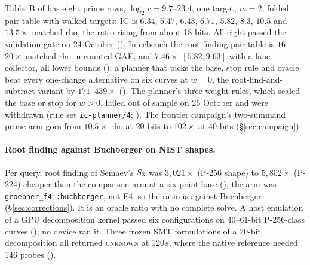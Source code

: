 Table~B of  has eight prime rows,
$\log_2 r=9.7$--$23.4$, one target, $m=2$, folded pair table with walked
targets: IC is $6.34$, $5.47$, $6.43$, $6.71$, $5.82$, $8.3$, $10.5$ and
$13.5\times$ matched rho, the ratio rising from about 18 bits. All eight
passed the validation gate on 24 October
(). In ecbench the root-finding
pair table is $16$--$20\times$ matched rho in counted GAE, and $7.46\times$
$[5.82,9.63]$ with a lane collector, all lower bounds
(); a planner that picks
the base, stop rule and oracle beat every one-change alternative on six
curves at $w=0$, the root-find-and-subtract variant by $171$--$439\times$
(). The planner's three
weight rules, which scaled the base or stop for $w>0$, failed out of sample
on 26 October and were withdrawn (rule set \texttt{ic-planner/4};
). The frontier campaign's
two-summand prime arm goes from $10.5\times$ rho at 20 bits to $102\times$ at
40 bits (\S\ref{sec:campaign}).

\paragraph{Root finding against Buchberger on NIST shapes.} Per query, root
finding of Semaev's $S_{3}$ was $3{,}021\times$ (P-256 shape) to
$5{,}802\times$ (P-224) cheaper than the comparison arm at a six-point base
(); the arm was
\texttt{groebner\_f4::buchberger}, not F4, so the ratio is against
Buchberger (\S\ref{sec:corrections}). It is an oracle ratio with no complete
solve. A host emulation of a GPU decomposition kernel passed six
configurations on 40--61-bit P-256-class curves
(); no device ran it.
Three frozen SMT formulations of a 20-bit decomposition all returned
\textsc{unknown} at 120\,s, where the native reference needed 146 probes
().

